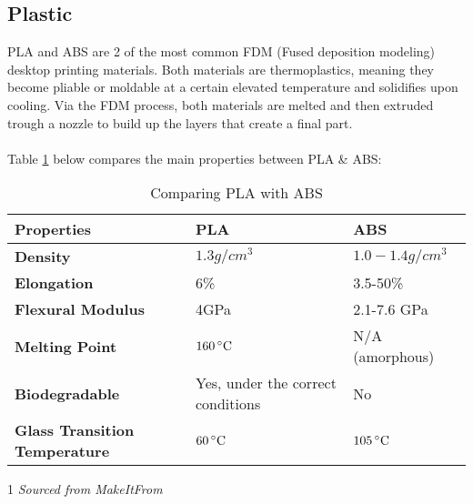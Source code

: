 \documentclass[a4paper]{article}
\begin{document}
\subsection{Plastic}
PLA and ABS are 2 of the most common FDM (Fused deposition modeling) desktop printing materials.
Both materials are thermoplastics, meaning they become pliable or moldable at a certain elevated temperature and solidifies upon cooling.
Via the FDM process, both materials are melted and then extruded trough a nozzle to build up the layers that create a final part.
\\ \\
Table \ref{tab:pla-abs} below compares the main properties between PLA \& ABS:
\begin{table}[ht]
    \centering
    \begin{threeparttable}
        \begin{tabular}[t]{>{\bfseries}l l l}
            \toprule
            Properties\tnote{1} & \textbf{PLA} & \textbf{ABS} \\
            \midrule
            Density & $1.3 g/cm^3$ & $1.0 - 1.4 g/cm^3$ \\
            Elongation & 6\% & 3.5-50\% \\ %
            Flexural Modulus & 4GPa & 2.1-7.6 GPa \\ %
            Melting Point & $160\,^{\circ}{\rm C}$ & N/A (amorphous) \\
            Biodegradable & Yes, under the correct conditions & No \\
            Glass Transition Temperature & $60\,^{\circ}{\rm C}$ & $105\,^{\circ}{\rm C}$ \\ %
            \bottomrule
        \end{tabular}
        \caption{Comparing PLA with ABS}
        \label{tab:pla-abs}
        \begin{tablenotes}
            \item[1] \textit{Sourced from MakeItFrom \cite{MakeItFrom}}
        \end{tablenotes}    
    \end{threeparttable}    
\end{table}
\end{document}

